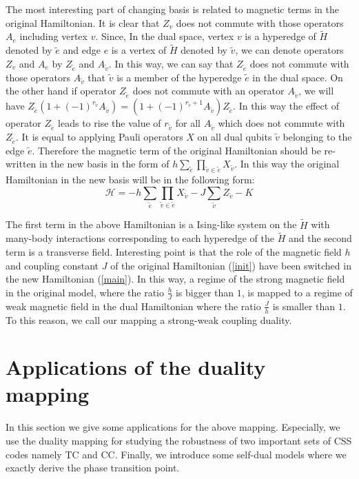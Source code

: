 \documentclass[preprintnumbers, showpacs, floatfix,twocolumn,
preprintnumbers, superscriptaddress]{revtex4}
\begin{document}
The most interesting part of changing basis is related to magnetic terms in the original Hamiltonian. It is clear that $Z_v$ does not commute with those operators $A_e$ including vertex $v$. Since, In the dual space, vertex $v$ is a hyperedge of $\tilde{H}$ denoted by $\tilde{e}$ and edge $e$ is a vertex of $\tilde{H}$ denoted by $\tilde{v}$, we can denote operators $Z_v$ and $A_e$ by $Z_{\tilde{e}}$ and $A_{\tilde{v}}$. In this way, we can say that $Z_{\tilde{e}}$ does not commute with those operators $A_{\tilde{v}}$ that $\tilde{v}$ is a member of the hyperedge $\tilde{e}$ in the dual space. On the other hand if operator $Z_{\tilde{e}}$ does not commute with an operator $A_{\tilde{v}}$, we will have $Z_{\tilde{e}} (1+(-1)^{r_{\tilde{v}} }A_{\tilde{v}})=(1+(-1)^{r_{\tilde{v}} +1} A_{\tilde{v}})Z_{\tilde{e}}$. In this way the effect of operator $Z_{\tilde{e}}$ leads to rise the value of $r_{\tilde{v}}$ for all $A_{\tilde{v}}$ which does not commute with $Z_{\tilde{e}}$. It is equal to applying Pauli operators $X$ on all dual qubits $\tilde{v}$ belonging to the edge $\tilde{e}$. Therefore the magnetic term of the original Hamiltonian should be re-written in the new basis in the form of $h\sum_{\tilde{e}} \prod_{\tilde{v} \in \tilde{e}}X_{\tilde{v}}$. In this way the original Hamiltonian in the new basis will be in the following form:
\begin{equation}\label{main}
\mathcal{H}=-h\sum_{\tilde{e}} \prod_{\tilde{v} \in \tilde{e}}X_{\tilde{v}} - J\sum_{\tilde{v}}Z_{\tilde{v}}-K
\end{equation}

The first term in the above Hamiltonian is a Ising-like system on the $\tilde{H}$ with many-body interactions corresponding to each hyperedge of the $\tilde{H}$ and the second term is a transverse field. Interesting point is that the role of the magnetic field $h$ and coupling constant $J$ of the original Hamiltonian (\ref{init}) have been switched in the new Hamiltonian (\ref{main}). In this way, a regime of the strong magnetic field in the original model, where the ratio $\frac{h}{J}$ is bigger than $1$, is mapped to a regime of weak magnetic field in the dual Hamiltonian where the ratio $\frac{J}{h}$ is smaller than $1$. To this reason, we call our mapping a strong-weak coupling duality.

\section{Applications of the duality mapping}\label{s4}
In this section we give some applications for the above mapping. Especially, we use the duality mapping for studying the robustness of two important sets of CSS codes namely TC and CC. Finally, we introduce some self-dual models where we exactly derive the phase transition point.
\end{document}
